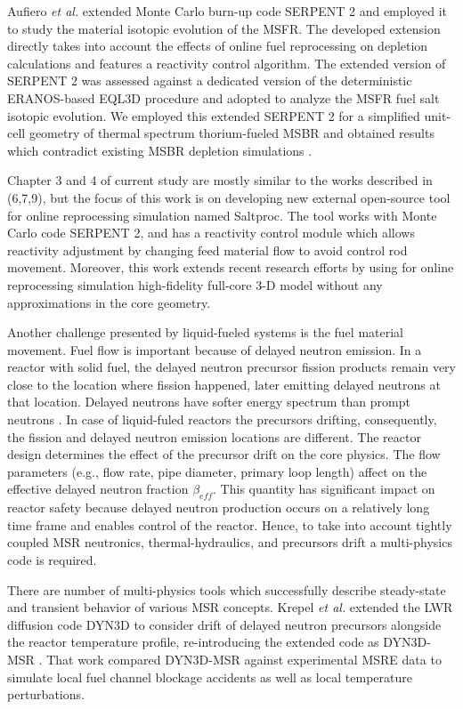 Aufiero \emph{et al.} extended Monte Carlo burn-up code SERPENT 2 and employed it to study the material isotopic evolution of the \gls{MSFR}. The developed extension directly takes into account the effects of online fuel reprocessing on depletion calculations and features a reactivity control algorithm. The extended version of SERPENT 2 was assessed against a dedicated version of the deterministic ERANOS-based EQL3D procedure \cite{ruggieri_eranos_2006} and adopted to analyze the \gls{MSFR} fuel salt isotopic evolution. We employed this extended SERPENT 2 for a simplified unit-cell geometry of thermal spectrum thorium-fueled \gls{MSBR} and obtained results which contradict existing \gls{MSBR} depletion simulations \cite{jeong_equilibrium_2016}.

Chapter 3 and 4 of current study are mostly similar to the works described in (6,7,9), but the focus of this work is on developing new external open-source tool for online reprocessing simulation named Saltproc. The tool works with Monte Carlo code SERPENT 2, and has a reactivity control module which allows reactivity adjustment by changing feed material flow to avoid control rod movement. Moreover, this work extends recent research efforts by using for online reprocessing simulation high-fidelity full-core 3-D model without any approximations in the core geometry.

Another challenge presented by liquid-fueled systems is the fuel material movement. Fuel flow is important because of delayed neutron emission. In a reactor with solid fuel, the delayed neutron precursor fission products remain very close to the location where fission happened, later emitting delayed neutrons at that location. Delayed neutrons have softer energy spectrum than prompt neutrons \cite{betzler_molten_2017}. In case of liquid-fuled reactors the precursors drifting, consequently, the fission and delayed neutron emission locations are different. The reactor design determines the effect of the precursor drift on the core physics. The flow parameters (e.g., flow rate, pipe diameter, primary loop length) affect on the effective delayed neutron fraction $\beta_{eff}$. This quantity has significant impact on reactor safety because delayed neutron production occurs on a relatively long time frame and enables control of the reactor. Hence, to take into account tightly coupled \gls{MSR} neutronics, thermal-hydraulics, and precursors drift a multi-physics code is required.

There are number of multi-physics tools which successfully describe steady-state and transient behavior of various \gls{MSR} concepts. Krepel \emph{et al.} extended the \gls{LWR} diffusion code DYN3D to consider drift of delayed neutron precursors alongside the reactor temperature profile, re-introducing the extended code as DYN3D-MSR \cite{krepel_dyn3d-msr_2007}. That work compared DYN3D-MSR against experimental \gls{MSRE} data to simulate local fuel channel blockage accidents as well as local temperature perturbations.


